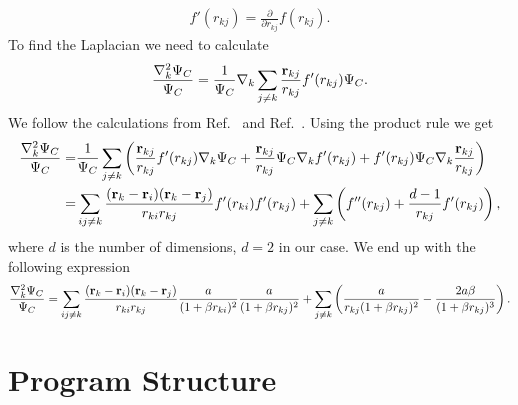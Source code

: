 \documentclass[../main.tex]{subfiles}
\begin{document}
\begin{appendices}
\begin{align}
    f'(r_{kj}) = \frac{\partial}{\partial r_{kj}} f(r_{kj}).
\end{align}
To find the Laplacian we need to calculate
\begin{align}
    \frac{\nabla^2_k \Psi_C}{\Psi_C } = \frac{1}{ \Psi_C }\nabla_k\sum_{j\ne k}\frac{{\bf r}_{kj}}{r_{kj}} f'(r_{kj}) \Psi_C.
\end{align}
We follow the calculations from Ref.~\cite{FYS4411-Slides} and Ref.~\cite{FYS4411-LectureNotes}. Using the product rule we get
\begin{align}
    \frac{\nabla^2_k \Psi_C}{\Psi_C } = &\frac{1}{ \Psi_C }\sum_{j\ne k}\left(\frac{{\bf r}_{kj}}{r_{kj}} f'(r_{kj}) \nabla_k\Psi_C + \frac{{\bf r}_{kj}}{r_{kj}} \Psi_C \nabla_k f'(r_{kj}) + f'(r_{kj}) \Psi_C \nabla_k\frac{{\bf r}_{kj}}{r_{kj}}\right)\\
    = &\sum_{ij\ne k}\frac{({\bf r}_k-{\bf r}_i)({\bf r}_k-{\bf r}_j)}{r_{ki}r_{kj}}f'(r_{ki})f'(r_{kj})+
    \sum_{j\ne k}\left( f''(r_{kj})+\frac{d-1}{r_{kj}}f'(r_{kj})\right),
\end{align}
where $d$ is the number of dimensions, $d=2$ in our case. We end up with the following expression 
\begin{align}
    \frac{\nabla^2_k \Psi_C}{\Psi_C }=
    \sum_{ij\ne k}\frac{({\bf r}_k-{\bf r}_i)({\bf r}_k-{\bf r}_j)}{r_{ki}r_{kj}}\frac{a}{(1+\beta r_{ki})^2}
    \frac{a}{(1+\beta r_{kj})^2}+
    \sum_{j\ne k}\left(\frac{a}{r_{kj}(1+\beta r_{kj})^2}-\frac{2a\beta}{(1+\beta r_{kj})^3}\right).
\end{align}


\chapter{Program Structure}


\end{appendices}
\end{document}
